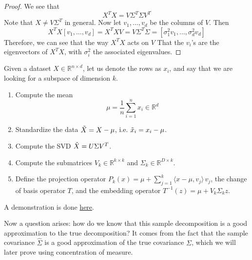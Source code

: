     \begin{proof}
      We see that 
      \begin{equation}
        X^T X =  V \Sigma^T \Sigma V^T
      \end{equation}
      Note that $X \neq V \Sigma^T$ in general. Now let $v_1, \ldots, v_d$ be the columns of $V$. Then 
      \begin{equation}
        X^T X [v_1, \ldots, v_d] = X^T X V = V \Sigma^T \Sigma = [\sigma_1^2 v_1, \ldots, \sigma_d^2 v_d]
      \end{equation}
      Therefore, we can see that the way $X^T X$ acts on $V$ That the $v_i$'s are the eigenvectors of $X^T X$, with $\sigma_i^2$ the associated eigenvalues. 
    \end{proof}

    \begin{algo}[Fitting] 
      Given a dataset $X \in \mathbb{R}^{n \times d}$, let us denote the rows as $x_i$, and say that we are looking for a subspace of dimension $k$. 
      \begin{enumerate}
        \item Compute the mean 
        \begin{equation}
          \mu = \frac{1}{n} \sum_{i=1}^n x_i  \in \mathbb{R}^d
        \end{equation} 

        \item Standardize the data $\Tilde{X} = X - \mu$, i.e. $\Tilde{x}_i = x_i - \mu$.  

        \item Compute the SVD $\Tilde{X} = U \Sigma V^T$.

        \item Compute the submatrices $V_k \in \mathbb{R}^{k \times k}$ and $\Sigma_k \in \mathbb{R}^{D \times k}$. 

        \item Define the projection operator $P_k (x) = \mu + \sum_{j=1}^k \langle x - \mu, v_j \rangle \, v_j$, the change of basis operator $T$, and the embedding operator $T^{-1} (z) = \mu + V_k \Sigma_k z$. 
      \end{enumerate} 
      A demonstration is done \href{code/pca.html}{here}.
    \end{algo}

    Now a question arises: how do we know that this sample decomposition is a good approximation to the true decomposition? It comes from the fact that the sample covariance $\hat{\Sigma}$ is a good approximation of the true covariance $\Sigma$, which we will later prove using concentration of measure. 

